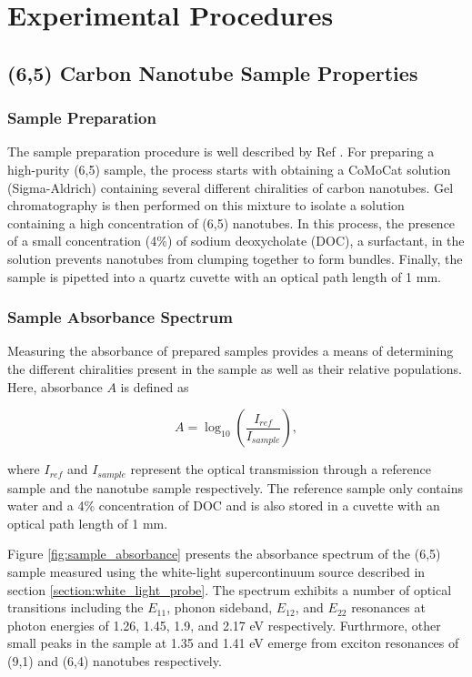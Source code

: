\chapter{Experimental Procedures}

\section{(6,5) Carbon Nanotube Sample Properties}

\subsection{Sample Preparation}
The sample preparation procedure is well described by Ref \cite{ichinose2017extraction}. For preparing a high-purity (6,5) sample, the process starts with obtaining a CoMoCat solution (Sigma-Aldrich) containing several different chiralities of carbon nanotubes. Gel chromatography is then performed on this mixture to isolate a solution containing a high concentration of (6,5) nanotubes. In this process, the presence of a small concentration (4\%) of sodium deoxycholate (DOC), a surfactant, in the solution prevents nanotubes from clumping together to form bundles. Finally, the sample is pipetted into a quartz cuvette with an optical path length of 1 mm. 

\subsection{Sample Absorbance Spectrum}

Measuring the absorbance of prepared samples provides a means of determining the different chiralities present in the sample as well as their relative populations. Here, absorbance $A$ is defined as 

\begin{equation}
A = \log_{10}\left(\dfrac{I_{ref}}{I_{sample}}\right),
\end{equation}

where $I_{ref}$ and $I_{sample}$ represent the optical transmission through a reference sample and the nanotube sample respectively. The reference sample only contains water and a 4\% concentration of DOC and is also stored in a cuvette with an optical path length of 1 mm. 

Figure \ref{fig:sample_absorbance} presents the absorbance spectrum of the (6,5) sample measured using the white-light supercontinuum source described in section \ref{section:white_light_probe}. The spectrum exhibits a number of optical transitions including the $E_{11}$, phonon sideband, $E_{12}$, and $E_{22}$ resonances at photon energies of 1.26, 1.45, 1.9, and 2.17 eV respectively. Furthrmore, other small peaks in the sample at 1.35 and 1.41 eV emerge from exciton resonances of (9,1) and (6,4) nanotubes respectively.

